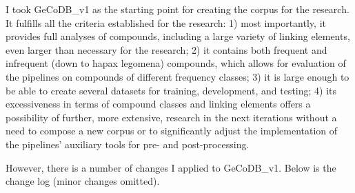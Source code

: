 \documentclass[11pt]{article}
\begin{document}
I took GeCoDB\_v1 as the starting point for creating the corpus for the research. It fulfills all the criteria established for the research: 1) most importantly, it provides full analyses of compounds, including a large variety of linking elements, even larger than necessary for the research; 2) it contains both frequent and infrequent (down to hapax legomena) compounds, which allows for evaluation of the pipelines on compounds of different frequency classes; 3) it is large enough to be able to create several datasets for training, development, and testing; 4) its excessiveness in terms of compound classes and linking elements offers a possibility of further, more extensive, research in the next iterations without a need to compose a new corpus or to significantly adjust the implementation of the pipelines' auxiliary tools for pre- and post-processing.

However, there is a number of changes I applied to GeCoDB\_v1. Below is the change log (minor changes omitted).
\end{document}

